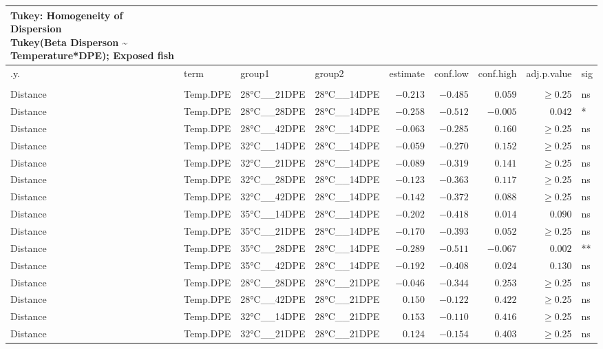 \documentclass[
]{article}
\begin{document}
\begin{longtable}{llllrrrrl}
\caption*{
{\large Tukey: Homogeneity of Dispersion} \\ 
{\small Tukey(Beta Disperson \textasciitilde{} Temperature*DPE); Exposed fish}
} \\ 
\toprule
.y. & term & group1 & group2 & estimate & conf.low & conf.high & adj.p.value & sig \\ 
\midrule\addlinespace[2.5pt]
\multicolumn{9}{l}{bray} \\ 
\midrule\addlinespace[2.5pt]
Distance & Temp.DPE & 28°C\_\_21DPE & 28°C\_\_14DPE & $-0.213$ & $-0.485$ & $0.059$ & $\geq$0.25 & ns \\ 
Distance & Temp.DPE & 28°C\_\_28DPE & 28°C\_\_14DPE & $-0.258$ & $-0.512$ & $-0.005$ & $0.042$ & * \\ 
Distance & Temp.DPE & 28°C\_\_42DPE & 28°C\_\_14DPE & $-0.063$ & $-0.285$ & $0.160$ & $\geq$0.25 & ns \\ 
Distance & Temp.DPE & 32°C\_\_14DPE & 28°C\_\_14DPE & $-0.059$ & $-0.270$ & $0.152$ & $\geq$0.25 & ns \\ 
Distance & Temp.DPE & 32°C\_\_21DPE & 28°C\_\_14DPE & $-0.089$ & $-0.319$ & $0.141$ & $\geq$0.25 & ns \\ 
Distance & Temp.DPE & 32°C\_\_28DPE & 28°C\_\_14DPE & $-0.123$ & $-0.363$ & $0.117$ & $\geq$0.25 & ns \\ 
Distance & Temp.DPE & 32°C\_\_42DPE & 28°C\_\_14DPE & $-0.142$ & $-0.372$ & $0.088$ & $\geq$0.25 & ns \\ 
Distance & Temp.DPE & 35°C\_\_14DPE & 28°C\_\_14DPE & $-0.202$ & $-0.418$ & $0.014$ & $0.090$ & ns \\ 
Distance & Temp.DPE & 35°C\_\_21DPE & 28°C\_\_14DPE & $-0.170$ & $-0.393$ & $0.052$ & $\geq$0.25 & ns \\ 
Distance & Temp.DPE & 35°C\_\_28DPE & 28°C\_\_14DPE & $-0.289$ & $-0.511$ & $-0.067$ & $0.002$ & ** \\ 
Distance & Temp.DPE & 35°C\_\_42DPE & 28°C\_\_14DPE & $-0.192$ & $-0.408$ & $0.024$ & $0.130$ & ns \\ 
Distance & Temp.DPE & 28°C\_\_28DPE & 28°C\_\_21DPE & $-0.046$ & $-0.344$ & $0.253$ & $\geq$0.25 & ns \\ 
Distance & Temp.DPE & 28°C\_\_42DPE & 28°C\_\_21DPE & $0.150$ & $-0.122$ & $0.422$ & $\geq$0.25 & ns \\ 
Distance & Temp.DPE & 32°C\_\_14DPE & 28°C\_\_21DPE & $0.153$ & $-0.110$ & $0.416$ & $\geq$0.25 & ns \\ 
Distance & Temp.DPE & 32°C\_\_21DPE & 28°C\_\_21DPE & $0.124$ & $-0.154$ & $0.403$ & $\geq$0.25 & ns \\ 

\end{longtable}
\end{document}
